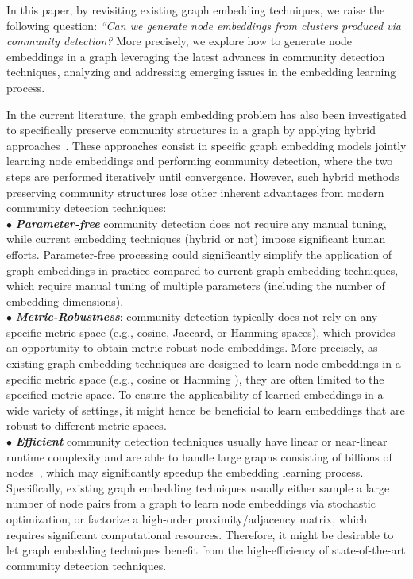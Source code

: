 \documentclass[conference]{IEEEtran}
\begin{document}
In this paper, by revisiting existing graph embedding techniques, we raise the following question: \emph{``Can we generate node embeddings from clusters produced via community detection?} More precisely, we explore how to generate node embeddings in a graph leveraging the latest advances in community detection techniques, analyzing and addressing emerging issues in the embedding learning process.

In the current literature, the graph embedding problem has also been investigated to specifically preserve community structures in a graph by applying hybrid approaches~\cite{ComE17,Wang17}. These approaches  consist in specific graph embedding models jointly learning node embeddings and performing community detection,
where the two steps are performed iteratively until convergence. However, such hybrid methods preserving community structures lose other inherent advantages from modern community detection techniques:
\\$\bullet$ \emph{\textbf{Parameter-free}} community detection does not require any manual tuning, while current embedding techniques (hybrid or not) impose significant human efforts.
Parameter-free processing could significantly simplify the application of graph embeddings in practice compared to current graph embedding techniques, which  require manual tuning of multiple parameters (including the number of embedding dimensions).
\\$\bullet$ \emph{\textbf{Metric-Robustness}}: community detection typically does not rely on any specific metric space (e.g., cosine, Jaccard, or Hamming spaces), which provides an opportunity to obtain metric-robust node embeddings. More precisely, as existing graph embedding techniques are designed to learn node embeddings in a specific metric space (e.g., cosine \cite{Dpwk14} or Hamming \cite{yang2017histosketch}), they are often limited to the specified metric space. To ensure the applicability of learned embeddings in a wide variety of settings, it might hence be beneficial to learn embeddings that are robust to different metric spaces.
\\$\bullet$ \emph{\textbf{Efficient}} community detection techniques usually have linear or near-linear runtime complexity and are able to handle large graphs consisting of billions of nodes~\cite{Bld08}, which may significantly speedup the embedding learning process. Specifically, existing graph embedding techniques usually either sample a large number of node pairs from a graph to learn node embeddings via stochastic optimization, or factorize a high-order proximity/adjacency matrix, which requires significant computational resources. Therefore, it might be desirable to let graph embedding techniques benefit from the high-efficiency of state-of-the-art community detection techniques.
\end{document}

